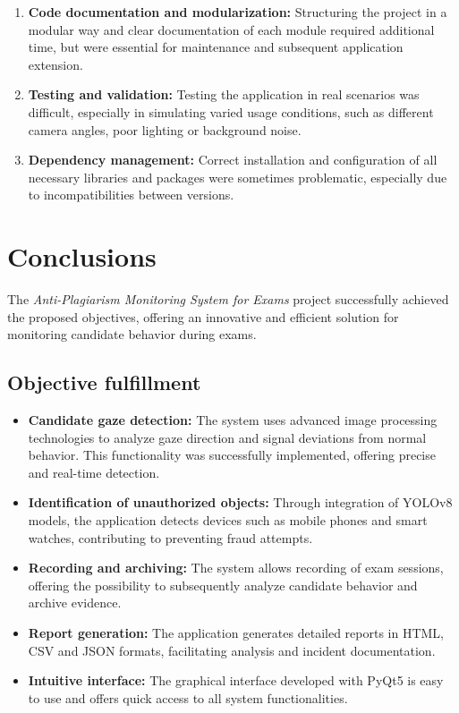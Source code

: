 \documentclass[12pt,a4paper]{article}
\begin{document}
\begin{enumerate}
    \item \textbf{Code documentation and modularization:} Structuring the project in a modular way and clear documentation of each module required additional time, but were essential for maintenance and subsequent application extension.

    \item \textbf{Testing and validation:} Testing the application in real scenarios was difficult, especially in simulating varied usage conditions, such as different camera angles, poor lighting or background noise.

    \item \textbf{Dependency management:} Correct installation and configuration of all necessary libraries and packages were sometimes problematic, especially due to incompatibilities between versions.
\end{enumerate}

\section{Conclusions}

The \textit{Anti-Plagiarism Monitoring System for Exams} project successfully achieved the proposed objectives, offering an innovative and efficient solution for monitoring candidate behavior during exams. 

\subsection{Objective fulfillment}

\begin{itemize}
    \item \textbf{Candidate gaze detection:} The system uses advanced image processing technologies to analyze gaze direction and signal deviations from normal behavior. This functionality was successfully implemented, offering precise and real-time detection.
    
    \item \textbf{Identification of unauthorized objects:} Through integration of YOLOv8 models, the application detects devices such as mobile phones and smart watches, contributing to preventing fraud attempts.
    
    \item \textbf{Recording and archiving:} The system allows recording of exam sessions, offering the possibility to subsequently analyze candidate behavior and archive evidence.
    
    \item \textbf{Report generation:} The application generates detailed reports in HTML, CSV and JSON formats, facilitating analysis and incident documentation.
    
    \item \textbf{Intuitive interface:} The graphical interface developed with PyQt5 is easy to use and offers quick access to all system functionalities.
\end{itemize}
\end{document}
